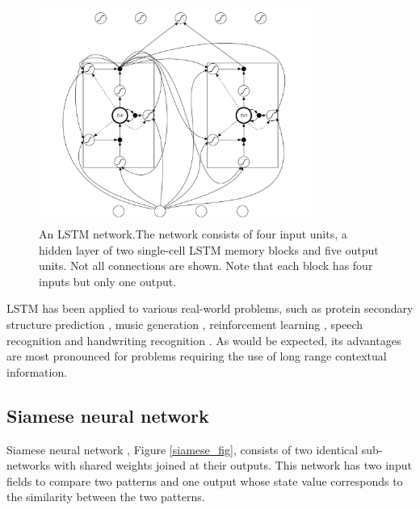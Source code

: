 \begin{figure}
	\centering
	\includegraphics[width=9cm]{img/LSTM.png}
	\caption{An LSTM network.The network consists of four input units, a hidden layer of two single-cell LSTM memory blocks and five output units. Not all connections are shown. Note that each block has four inputs but only one output.}
	\label{LSTM}
\end{figure}

LSTM has been applied to various real-world problems, such
as protein secondary structure prediction \cite{hochreiter2007fast} \cite{chen2005protein}, music generation \cite{eck2002finding}, reinforcement learning \cite{bakker2002reinforcement}, speech recognition \cite{graves2005framewise} \cite{graves2006connectionist} and handwriting recognition \cite{graves2009offline} \cite{graves2008unconstrained}. As would be expected, its advantages are most pronounced for problems requiring the use of long range contextual information.

\subsection{Siamese neural network}
Siamese neural network \cite{bromley1994signature}, Figure \ref{siamese_fig}, consists of two identical sub-networks with shared weights joined at their outputs. This network has two input fields to compare two patterns and one output whose state value corresponds to the similarity between the two patterns.

